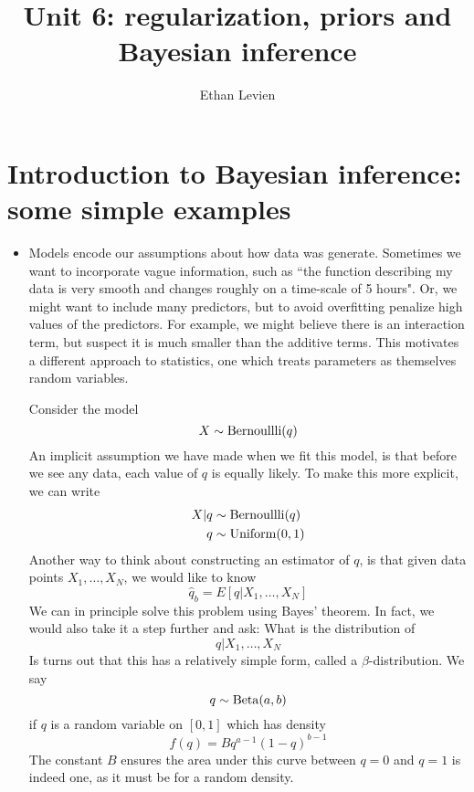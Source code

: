 


\setcounter{unit}{1}
\setcounter{section}{0}






\title{Unit 6: regularization, priors and Bayesian inference}
\author{Ethan Levien}
\maketitle


\section{Introduction to Bayesian inference: some simple examples}


\begin{itemize}
\item Models encode our assumptions about how data was generate. Sometimes we want to incorporate vague information, such as ``the function describing my data is very smooth and changes roughly on a time-scale of 5 hours". Or, we might want to include many predictors, but to avoid overfitting penalize high values of the predictors. For example, we might believe there is an interaction term, but suspect it is much smaller than the additive terms. This motivates a different approach to statistics, one which treats parameters as themselves random variables.  

\begin{example}\label{ex:beta}
Consider the model 
\begin{equation*}
X \sim {\rm Bernoullli}(q)
\end{equation*}
An implicit assumption we have made when we fit this model, is that before we see any data, each value of $q$ is equally likely. To make this more explicit, we can write
\begin{align*}
X|q &\sim {\rm Bernoullli}(q)\\
q &\sim {\rm Uniform}(0,1)
\end{align*}
Another way to think about constructing an estimator of $q$, is that given data points $X_1,\dots,X_N$, we would like to know 
\begin{equation}
\hat{q}_b = E[q|X_1,\dots,X_N]\label{eq:qhatb}
\end{equation}
We can in principle solve this problem using Bayes' theorem. In fact, we would also take it a step further and ask: What is the distribution of
\begin{equation*}
q|X_1,\dots,X_N
\end{equation*}
Is turns out that this has a relatively simple form, called a $\beta$-distribution. We say 
\begin{equation*}
q \sim {\rm Beta}(a,b)
\end{equation*}
if $q$ is a random variable on $[0,1]$ which has density 
\begin{equation*}
f(q) = Bq^{a-1}(1-q)^{b-1}
\end{equation*}
The constant $B$ ensures the area under this curve between $q=0$ and $q=1$ is indeed one, as it must be for a random density. \\



\end{example}
\end{itemize}
